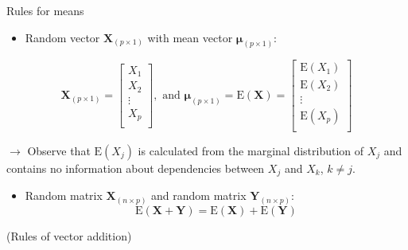 \documentclass[ignorenonframetext,]{beamer}
\providecommand{\tightlist}{%
  \setlength{\itemsep}{0pt}\setlength{\parskip}{0pt}}
\begin{document}
\begin{frame}

\begin{block}{Rules for means}

\begin{itemize}
\tightlist
\item
  Random vector \(\mathbf{X}_{(p\times 1)}\) with mean vector
  \(\mathbf{\mu}_{(p\times 1)}\):
\end{itemize}

\[\mathbf{X}_{(p\times 1)}=\left[ \begin{array}{c}X_1\\ X_2\\ \vdots\\ X_p\\ \end{array}\right], \text{ and }\mathbf{\mu}_{(p \times 1)}=\text{E}(\mathbf{X})=\left[ \begin{array}{c}\text{E}(X_1)\\ \text{E}(X_2)\\ \vdots\\ \text{E}(X_p)\\ \end{array}\right]\]

\(\rightarrow\) Observe that \(\text{E}(X_j)\) is calculated from the
marginal distribution of \(X_j\) and contains no information about
dependencies between \(X_{j}\) and \(X_k\), \(k\neq j\).

\begin{itemize}
\tightlist
\item
  Random matrix \(\mathbf{X}_{(n\times p)}\) and random matrix
  \(\mathbf{Y}_{(n\times p)}\):
  \[\text{E}(\mathbf{X}+\mathbf{Y})=\text{E}(\mathbf{X})+\text{E}(\mathbf{Y})\]
\end{itemize}

(Rules of vector addition)

\end{block}

\end{frame}
\end{document}
